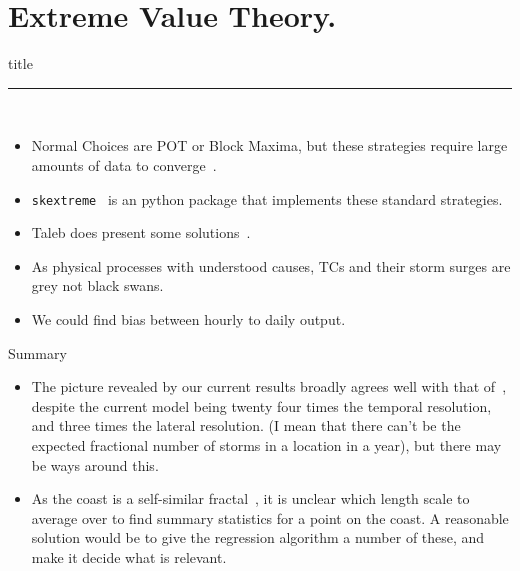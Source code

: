 \documentclass[usenames, dvipsnames]{beamer}
\begin{document}
\section{Extreme Value Theory. }
\begin{frame}[plain]
        \vfill
      \centering
      \begin{beamercolorbox}[sep=8pt,center,shadow=true,rounded=true]{title}
        \insertsectionhead\par%
        \color{oxfordblue}\noindent\rule{10cm}{1pt} \\
        \begin{itemize}
        \item Normal Choices are POT or Block Maxima, but these strategies require
              large amounts of data to converge~\cite{taleb2019much}.
        \item \texttt{skextreme}~\cite{skextremes} is an python package that implements these
              standard strategies.
        \item Taleb does present some solutions~\cite{taleb2019statistical}.
        \item As physical processes with understood causes, TCs
              and their storm surges are grey not black swans.
        \item We could find bias between hourly to daily output.
        \end{itemize}
      \end{beamercolorbox}
      \vfill
\end{frame}


\begin{frame}{Summary}
\begin{itemize}
\item The picture revealed by our current results broadly agrees well with that
      of~\cite{ZannaPreprint}, despite the current model being twenty four times
      the temporal resolution, and three times the lateral resolution.
       (I mean that there can't be the expected fractional number of storms
        in a location in a year), but there may be ways around this.
\item As the coast is a self-similar fractal~\cite{mandelbrot1967long, richardson1961problem},
      it is unclear which length scale to average over to find summary statistics
      for a point on the coast. A reasonable solution would be to give the
      regression algorithm a number of these, and make it decide what is relevant.
\end{itemize}

\end{frame}
\end{document}
